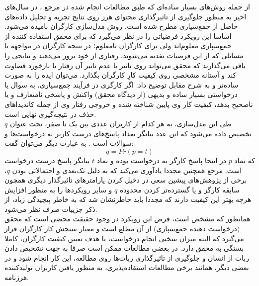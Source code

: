 از جمله روش‌های بسیار ساده‌ای که طبق مطالعات انجام شده در مرجع
\cite{li_crowdsourced_2016}،
در سال‌های اخیر به منظور جلوگیری از تاثیرگذاری محتوای هرز روی نتایج تجزیه و تحلیل داده‌های حاصل از جمع‌سپاری مطرح شده است، روش مدل‌سازی کارگران نامیده می‌شود. اساسا این رویکرد فرضیاتی را در نظر می‌گیرد که برای محقق استفاده کننده از جمع‌سپاری معلوم‌اند ولی برای کارگران نامعلوم؛ در نتیجه کارگران در مواجهه با مسائلی که از این فرضیات تغذیه می‌شوند، رفتاری از خود بروز می‌دهند و نتایجی را باقی می‌گذارند که محقق می‌تواند روی تاثیر یا عدم تاثیر آن رفتار یا بازخورد قضاوت کند و آستانه مشخصی روی کیفیت کارِ کارگران بگذارد. می‌توان ایده را به صورت ساده‌تر و به شرح مقابل توضیح داد: اگر کارگری در فرآیند جمع‌سپاری، به سوال یا درخواستی بسیار ساده و بدیهی (از دیدگاه محقق) واکنش و پاسخی نامتعارف و یا ناصحیح بدهد، کیفیت کار وی پایین شناخته شده و خروجی رفتار وی از جمله‌ کاندیداهای حذف در نتیجه‌گیری نهایی است.\\
طی این مدل‌سازی، به هر کدام از کاربران عددی بین یک تا صفر، تحت عنوان
$q$
تخصیص داده می‌شود که این عدد بیانگر تعداد پاسخ‌های درست کاربر به درخواست‌ها و سوالات است
\cite{li_crowdsourced_2016}.
به عبارت دیگر می‌توان گفت:
\begin{equation}
	q = Pr(p=t)
\end{equation}
که نماد $p$ در اینجا پاسخ کارگر به درخواست بوده و نماد $t$ بیانگر پاسخ درست درخواست است. مرجع
\cite{li_crowdsourced_2016}
همچنین مجددا یادآوری می‌کند که به دلیل  تک‌بعدی و احتمالاتی بودن $q$، برخی از پژوهش‌های پیشین سعی در دخیل کردن پارامترهای تاثیرگذار دیگری همچون سابقه کارگر و یا گسترده‌تر کردن محدوده $q$ و سایر رویکردها را به منظور افزایش هرچه بهتر این کیفیت دارند که مجددا باید خاطرنشان شد که به خاطر پیچیدگی زیاد، از ذکر جزییات صرف نظر می‌شود.\\
همانطور که مشخص است، فرض این رویکرد در وجود حقیقت محضی است که محقق (درخواست دهنده جمع‌سپاری) از آن مطلع است و معیار سنجش کار کارگران قرار می‌گیرد که البته میزان سختی انجام درخواست، با هدف تعیین کیفیت کارگران، کاملا بستگی به محقق دارد. در بعضی مطالعات ممکن است صرفا به جهت تشخیص دادن ربات از انسان و جلوگیری از تاثیرگذاری ربات‌ها روی مطالعه، این کار انجام شود و در بعضی دیگر، همانند برخی مطالعات استفاده‌پذیری، به منظور یافتن کاربران تولیدکننده هرزنامه.
